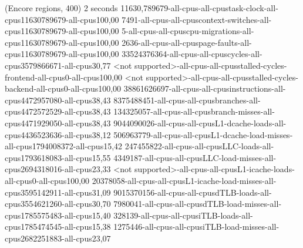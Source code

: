 (Encore regions, 400)
2 seconds
11630,789679-all-cpus-all-cpustask-clock-all-cpus11630789679-all-cpus100,00
7491-all-cpus-all-cpuscontext-switches-all-cpus11630789679-all-cpus100,00
5-all-cpus-all-cpuscpu-migrations-all-cpus11630789679-all-cpus100,00
2636-all-cpus-all-cpuspage-faults-all-cpus11630789679-all-cpus100,00
33524376364-all-cpus-all-cpuscycles-all-cpus3579866671-all-cpus30,77
<not supported>-all-cpus-all-cpusstalled-cycles-frontend-all-cpus0-all-cpus100,00
<not supported>-all-cpus-all-cpusstalled-cycles-backend-all-cpus0-all-cpus100,00
38861626697-all-cpus-all-cpusinstructions-all-cpus4472957080-all-cpus38,43
8375488451-all-cpus-all-cpusbranches-all-cpus4472572529-all-cpus38,43
134325057-all-cpus-all-cpusbranch-misses-all-cpus4471929050-all-cpus38,43
9044090026-all-cpus-all-cpusL1-dcache-loads-all-cpus4436523636-all-cpus38,12
506963779-all-cpus-all-cpusL1-dcache-load-misses-all-cpus1794008372-all-cpus15,42
247455822-all-cpus-all-cpusLLC-loads-all-cpus1793618083-all-cpus15,55
4349187-all-cpus-all-cpusLLC-load-misses-all-cpus2694318016-all-cpus23,33
<not supported>-all-cpus-all-cpusL1-icache-loads-all-cpus0-all-cpus100,00
20378058-all-cpus-all-cpusL1-icache-load-misses-all-cpus3595142911-all-cpus31,09
9015370156-all-cpus-all-cpusdTLB-loads-all-cpus3554621260-all-cpus30,70
7980041-all-cpus-all-cpusdTLB-load-misses-all-cpus1785575483-all-cpus15,40
328139-all-cpus-all-cpusiTLB-loads-all-cpus1785474545-all-cpus15,38
1275446-all-cpus-all-cpusiTLB-load-misses-all-cpus2682251883-all-cpus23,07
